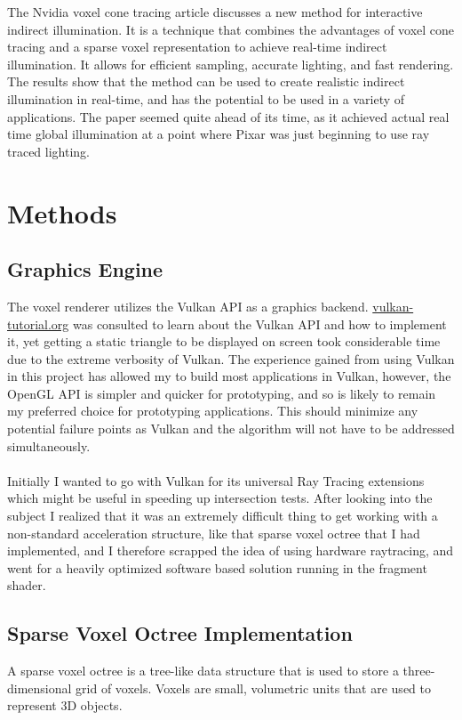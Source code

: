 The Nvidia voxel cone tracing article \cite{10.1145/2037826.2037853} discusses a new method for interactive indirect illumination. It is a technique that combines the advantages of voxel cone tracing and a sparse voxel representation to achieve real-time indirect illumination. It allows for efficient sampling, accurate lighting, and fast rendering. The results show that the method can be used to create realistic indirect illumination in real-time, and has the potential to be used in a variety of applications. The paper seemed quite ahead of its time, as it achieved actual real time global illumination at a point where Pixar was just beginning to use ray traced lighting. 

\section{Methods}
\subsection*{Graphics Engine}
The voxel renderer utilizes the Vulkan API as a graphics backend. \url{vulkan-tutorial.org} \cite{VKTUT} was consulted to learn about the Vulkan API and how to implement it, yet getting a static triangle to be displayed on screen took considerable time due to the extreme verbosity of Vulkan. The experience gained from using Vulkan in this project has allowed my to build most applications in Vulkan, however, the OpenGL API is simpler and quicker for prototyping, and so is likely to remain my preferred choice for prototyping applications. This should minimize any potential failure points as Vulkan and the algorithm will not have to be addressed simultaneously. \\
\\
Initially I wanted to go with Vulkan for its universal Ray Tracing extensions which might be useful in speeding up intersection tests. After looking into the subject I realized that it was an extremely difficult thing to get working with a non-standard acceleration structure, like that sparse voxel octree that I had implemented, and I therefore scrapped the idea of using hardware raytracing, and went for a heavily optimized software based solution running in the fragment shader. 

\subsection*{Sparse Voxel Octree Implementation}
A sparse voxel octree is a tree-like data structure that is used to store a three-dimensional grid of voxels. Voxels are small, volumetric units that are used to represent 3D objects.

